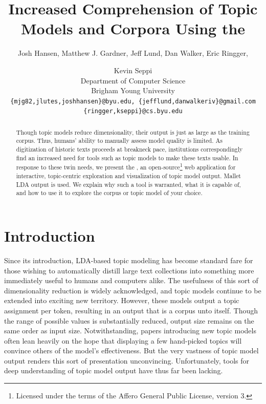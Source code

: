 \documentclass[11pt]{article}
\title{Increased Comprehension of Topic Models and Corpora Using the \toolname{}}
\author{Josh Hansen, Matthew J. Gardner, Jeff Lund, Dan Walker, Eric Ringger, \and Kevin Seppi\\
Department of Computer Science\\
Brigham Young University\\
\tt \{mjg82,jlutes,joshhansen\}@byu.edu, \{jefflund,danwalkeriv\}@gmail.com\\
\tt \{ringger,kseppi\}@cs.byu.edu}
\begin{document}
\maketitle


\begin{abstract}
Though topic models reduce dimensionality, their output is just as large as the training corpus.
Thus, humans' ability to manually assess model quality is limited. As digitization of historic texts
proceeds at breakneck pace, institutions correspondingly find an increased need for tools such as
topic models to make these texts usable. In response to these twin needs, we present the \toolname{},
an open-source\footnote{Licensed under the terms of the
Affero General Public License, version 3.} web application for interactive, topic-centric
exploration and visualization of topic model output. Mallet LDA output is used.
We explain why such a tool is warranted, what it is capable of, and
how to use it to explore the corpus or topic model of your choice.
\end{abstract}

\section{Introduction}
Since its introduction, LDA-based topic modeling \cite{blei_latent_2003} has
become standard fare for those wishing to automatically distill large text
collections into something more immediately useful to humans and computers
alike. The usefulness of this sort of dimensionality reduction is widely
acknowledged, and topic models continue to be extended into exciting new
territory.
\cite{wang_continuous_2008,mimno_polylingual_2009,boyd-graber_holistic_2010,
brody_unsupervised_2010,he_detecting_2009,yao_efficient_2009} However, these
models output a topic assignment per token, resulting in an output that is a
corpus unto itself. Though the range of possible values is substantially
reduced, output size remains on the same order as input size. Notwithstanding,
papers introducing new topic models often lean heavily on the hope that
displaying a few hand-picked topics will convince others of the model's
effectiveness. But the very vastness of topic model output renders this sort of
presentation unconvincing. Unfortunately, tools for deep understanding of topic
model output have thus far been lacking.
\end{document}
